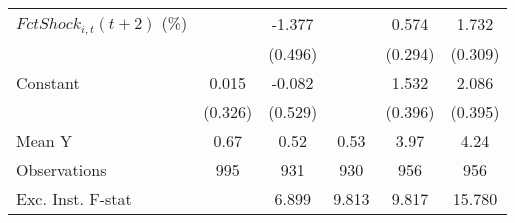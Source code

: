 {\begin{tabular}{l*{5}{c}}
\addlinespace
$ FctShock_{i,t}(t+2)$ (\%)&                     &      -1.377\sym{***}&                     &       0.574\sym{*}  &       1.732\sym{***}\\
                    &                     &     (0.496)         &                     &     (0.294)         &     (0.309)         \\
\addlinespace
Constant            &       0.015         &      -0.082         &                     &       1.532\sym{***}&       2.086\sym{***}\\
                    &     (0.326)         &     (0.529)         &                     &     (0.396)         &     (0.395)         \\
\midrule
Mean Y              &        0.67         &        0.52         &        0.53         &        3.97         &        4.24         \\
Observations        &         995         &         931         &         930         &         956         &         956         \\
Exc. Inst. F-stat   &                     &       6.899         &       9.813         &       9.817         &      15.780         \\
\bottomrule
\end{tabular}
}
